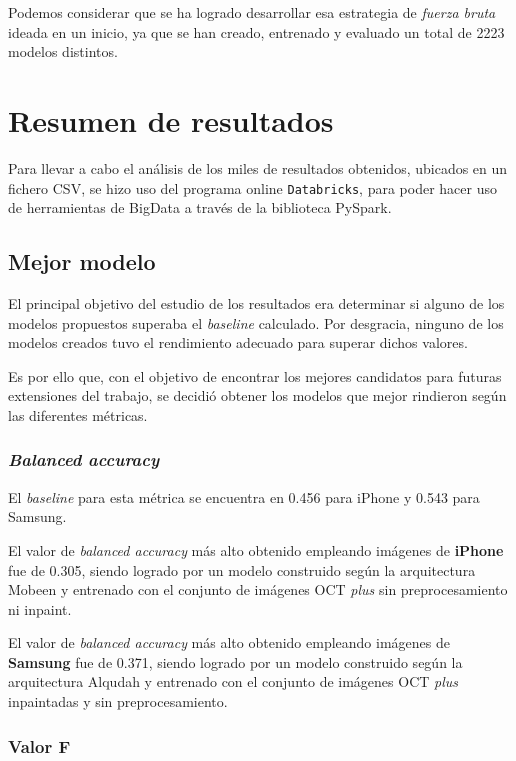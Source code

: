Podemos considerar que se ha logrado desarrollar esa estrategia de \textit{fuerza bruta} ideada en un inicio, ya que se han creado, entrenado y evaluado un total de 2223 modelos distintos.

\section{Resumen de resultados}

Para llevar a cabo el análisis de los miles de resultados obtenidos, ubicados en un fichero CSV, se hizo uso del programa online \texttt{Databricks}, para poder hacer uso de herramientas de BigData a través de la biblioteca PySpark.

\subsection{Mejor modelo}

El principal objetivo del estudio de los resultados era determinar si alguno de los modelos propuestos superaba el \textit{baseline} calculado. Por desgracia, ninguno de los modelos creados tuvo el rendimiento adecuado para superar dichos valores.

Es por ello que, con el objetivo de encontrar los mejores candidatos para futuras extensiones del trabajo, se decidió obtener los modelos que mejor rindieron según las diferentes métricas.

\subsubsection{\textit{Balanced accuracy}}

El \textit{baseline} para esta métrica se encuentra en 0.456 para iPhone y 0.543 para Samsung.

El valor de \textit{balanced accuracy} más alto obtenido empleando imágenes de \textbf{iPhone} fue de 0.305, siendo logrado por un modelo construido según la arquitectura Mobeen y entrenado con el conjunto de imágenes OCT \textit{plus} sin preprocesamiento ni inpaint.

El valor de \textit{balanced accuracy} más alto obtenido empleando imágenes de \textbf{Samsung} fue de 0.371, siendo logrado por un modelo construido según la arquitectura Alqudah y entrenado con el conjunto de imágenes OCT \textit{plus} inpaintadas y sin preprocesamiento.

\subsubsection{Valor F}

